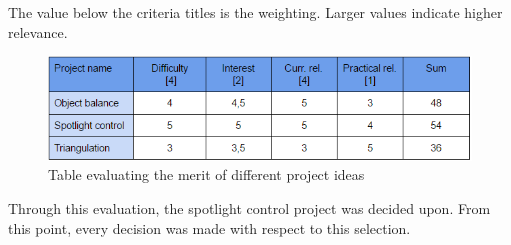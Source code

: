 The value below the criteria titles is the weighting. Larger values indicate higher relevance.

\begin{figure}[h!]
\centering
\includegraphics[scale=0.9]{Billeder/IDEA_WEIGHT.png}
\caption{Table evaluating the merit of different project ideas}
\label{fig:ProjectEvaluation}
\end{figure}

Through this evaluation, the spotlight control project was decided upon. From this point, every decision was made with respect to this selection.
